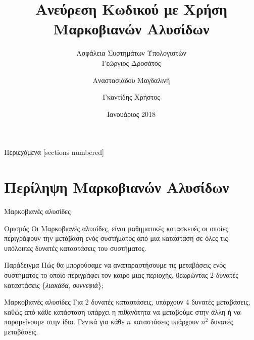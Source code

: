 \documentclass[10pt]{beamer}
\title[Ασφάλεια Συστημάτων Υπολογιστών]{
    Ανεύρεση Κωδικού με Χρήση Μαρκοβιανών Αλυσίδων \\[10pt]
}
\subtitle{
    Ασφάλεια Συστημάτων Υπολογιστών \\
    Γεώργιος Δροσάτος
}
\author{
    Αναστασιάδου Μαγδαλινή \and Γκαντίδης Χρήστος
}
\institute[Δ.Π.Θ.]{
Τμήμα Ηλεκτρολόγων Μηχανικών και Μηχανικών Υπολογιστών\\
Δημοκρίτειο Πανεπιστήμιο Θράκης
}
\date{Ιανουάριος 2018}
\begin{document}
\maketitle

\begin{frame}{Περιεχόμενα}
    [sections numbered]
    \tableofcontents[hideallsubsections]
\end{frame}

\section{Περίληψη Μαρκοβιανών Αλυσίδων}
    \begin{frame}{Μαρκοβιανές αλυσίδες}
        \begin{block}{Ορισμός}
            Οι Μαρκοβιανές αλυσίδες, είναι μαθηματικές κατασκευές οι οποίες περιγράφουν την μετάβαση ενός συστήματος από μια κατάσταση σε όλες τις υπόλοιπες δυνατές καταστάσεις του συστήματος.
        \end{block}
        \pause
        \begin{block}{Παράδειγμα}
            Πώς θα μπορούσαμε να αναπαραστήσουμε τις μεταβάσεις ενός συστήματος το οποίο περιγράφει
            τον καιρό μιας περιοχής, θεωρώντας 2 δυνατές καταστάσεις \{\textit{λιακάδα}, \textit{συννεφιά}\};
        \end{block}
    \end{frame}
\begin{frame}{Μαρκοβιανές αλυσίδες}
    Για 2 δυνατές καταστάσεις, υπάρχουν 4 δυνατές μεταβάσεις, καθώς από κάθε κατάσταση υπάρχει η πιθανότητα να μεταβούμε στην άλλη ή να παραμείνουμε στην ίδια. Γενικά για κάθε $n$ καταστάσεις υπάρχουν $n^2$ δυνατές μεταβάσεις.

    \begin{figure}[h]
        \centering
    \end{figure}
\end{frame}
\end{document}
